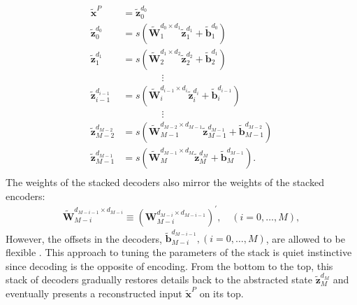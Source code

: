 \documentclass[11pt]{article}
\newcommand{\vecEC}[1]{\boldsymbol{#1}}
\newcommand{\vecDC}[1]{\boldsymbol{\tilde{#1}}}
\newcommand{\WEC}{\vecEC{W}}                   %
\newcommand{\WEI}[3]{\WEC_{#1}^{d_{#2} \times d_{#3}}} %
\newcommand{\WDC}{\vecDC{W}}                   %
\newcommand{\WDI}[3]{\WDC_{#1}^{d_{#2} \times d_{#3}}} %
\newcommand{\bDC}{\vecDC{b}}    %
\newcommand{\bDI}[2]{\bDC_{#1}^{d_{#2}}} %
\newcommand{\xDC}{\vecDC{x}}
\newcommand{\zDC}{\vecDC{z}}
\newcommand{\zDI}[2]{\zDC_{#1}^{d_{#2}}}
\begin{document}
\begin{equation} \label{eq:SD}
  \begin{split}
    \xDC^P &= \zDI{0}{0} \\
    \zDI{0  }{0  } &= s(\WDI{1  }{0  }{1  } \zDI{1  }{1  } + \bDI{1  }{0  }) \\
    \zDI{1  }{1  } &= s(\WDI{2  }{1  }{2  } \zDI{2  }{2  } + \bDI{2  }{1  }) \\
    & \quad \quad \quad \quad \vdots \\
    \zDI{i-1}{i-1} &= s(\WDI{i  }{i-1}{i  } \zDI{i  }{i  } + \bDI{i  }{i-1}) \\
    & \quad \quad \quad \quad \vdots \\
    \zDI{M-2}{M-2} &= s(\WDI{M-1}{M-2}{M-1} \zDI{M-1}{M-1} + \bDI{M-1}{M-2}) \\
    \zDI{M-1}{M-1} &= s(\WDI{M  }{M-1}{M  } \zDI{M  }{M  } + \bDI{M  }{M-1}). \\
  \end{split}
\end{equation}
The weights of the stacked decoders also mirror the weights of the stacked encoders:
\begin{align}
  \WDI{M-i}{M-i-1}{M-i} \equiv {(\WEI{M-i}{M-i}{M-i-1})}^\prime, \quad (i=0, \dots, M),
\end{align}
However, the offsets in the decoders, $\bDI{M-i}{M-i-1}, (i=0, \dots, M)$, are allowed to be flexible \citep{DL:SDA1}. This approach to tuning the parameters of the stack is quiet instinctive since decoding is the opposite of encoding. From the bottom to the top, this stack of decoders gradually restores details back to the abstracted state $\zDI{M}{M}$ and eventually presents a reconstructed input $\xDC^P$ on its top.
\end{document}
